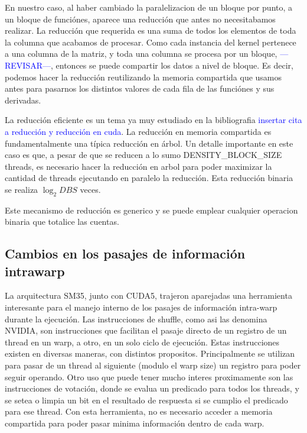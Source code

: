 En nuestro caso, al haber cambiado la paralelizacion de un bloque por punto, a un bloque
de funci\'ones, aparece una reducci\'on que antes no necesitabamos realizar. La reducci\'on que
requerida es una suma de todos los elementos de toda la columna que acabamos de procesar.
Como cada instancia del kernel pertenece a una columna de la matriz, y toda una columna se
procesa por un bloque, \textcolor{blue}{---REVISAR---}, entonces se puede compartir los datos
a nivel de bloque. Es decir, podemos hacer la reducci\'on reutilizando la memoria compartida
que usamos antes para pasarnos los distintos valores de cada fila de las funci\'ones y sus derivadas.

La reducci\'on eficiente es un tema ya muy estudiado en la bibliografia \textcolor{blue}{insertar cita a
reducci\'on y reducci\'on en cuda}. La reducci\'on en memoria compartida es fundamentalmente
una t\'ipica reducci\'on en \'arbol. Un detalle importante en este caso es que, a pesar de que
se reducen a lo sumo DENSITY\_BLOCK\_SIZE threads, es necesario hacer la reducci\'on en arbol
para poder maximizar la cantidad de threads ejecutando en paralelo la reducci\'on. Esta reducci\'on
binaria se realiza $\log_2{DBS}$ veces.

Este mecanismo de reducci\'on es generico y se puede emplear cualquier operacion binaria que
totalice las cuentas.


\subsection{Cambios en los pasajes de informaci\'on intrawarp}
La arquitectura SM35, junto con CUDA5, trajeron aparejadas una herramienta interesante
para el manejo interno de los pasajes de informaci\'on intra-warp durante la ejecuci\'on.
Las instrucciones de shuffle, como asi las denomina NVIDIA, son instrucciones que facilitan
el pasaje directo de un registro de un thread en un warp, a otro, en un solo ciclo de ejecuci\'on.
Estas instrucciones existen en diversas maneras, con distintos propositos. Principalmente se
utilizan para pasar de un thread al siguiente (modulo el warp size) un registro para poder seguir
operando. Otro uso que puede tener mucho interes proximamente son las instrucciones de votaci\'on,
donde se evalua un predicado para todos los threads, y se setea o limpia un bit en el resultado
de respuesta si se cumplio el predicado para ese thread. Con esta herramienta, no es necesario
acceder a memoria compartida para poder pasar minima informaci\'on dentro de cada warp.

